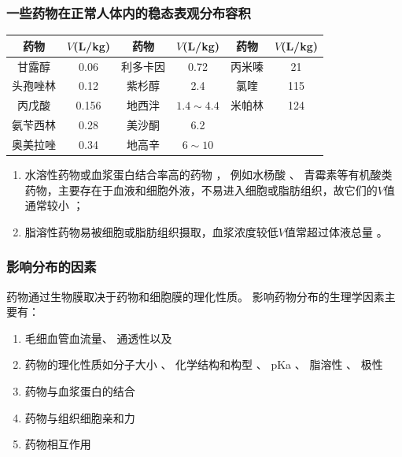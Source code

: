 \documentclass[dvipsnames, svgnames, x11names]{beamer}
\begin{document}
\begin{frame}
    \frametitle{一些药物在正常人体内的稳态表观分布容积}
    \begin{table}
        \centering
        \begin{tabular}{cc|cc|cc}
            \bottomrule
            药物 & $V$(\si{L/kg}) & 药物 & $V$(\si{L/kg}) & 药物 & $V$(\si{L/kg}) \\ \hline
            甘露醇 & 0.06 & 利多卡因 & 0.72 & 丙米嗪 & 21  \\
            头孢唑林 & 0.12 & 紫杉醇 & 2.4 & 氯喹 & 115 \\
            丙戊酸 & 0.156 & 地西泮 & $1.4\sim 4.4$ & 米帕林 & 124 \\
            氨苄西林 & 0.28 & 美沙酮 & 6.2  \\
            奥美拉唑 & 0.34 & 地高辛 & $6\sim 10$  \\ \toprule
        \end{tabular}
    \end{table}
    \begin{enumerate}
      \item 水溶性药物或血浆蛋白结合率高的药物 ， 例如水杨酸 、 青霉素等有机酸类药物，主要存在于血液和细胞外液，不易进入细胞或脂肪组织，故它们的$V$值通常较小 ；
      \item 脂溶性药物易被细胞或脂肪组织摄取，血浆浓度较低$V$值常超过体液总量 。
    \end{enumerate}
\end{frame}


\begin{frame}
    \frametitle{影响分布的因素}
    药物通过生物膜取决于药物和细胞膜的理化性质。 影响药物分布的生理学因素主要有：
    \begin{enumerate}
      \item 毛细血管血流量、 通透性以及
      \item 药物的理化性质如分子大小 、 化学结构和构型 、 pKa 、 脂溶性 、 极性
      \item 药物与血浆蛋白的结合
      \item 药物与组织细胞亲和力
      \item 药物相互作用
    \end{enumerate}
\end{frame}
\end{document}
